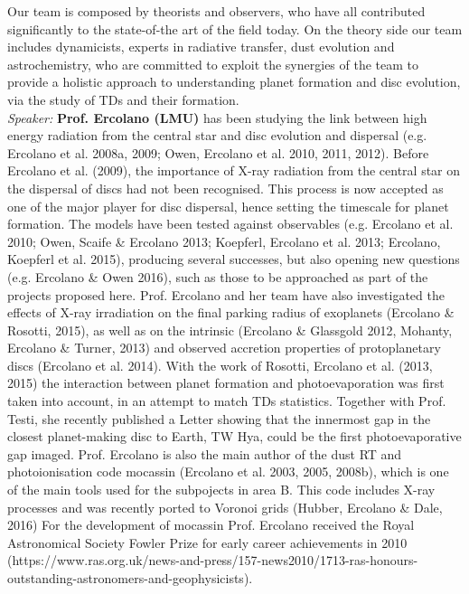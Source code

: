 \documentclass[12pt]{article}
\begin{document}
Our team is composed by theorists and observers, who have all
contributed significantly to the state-of-the art of the field today. 
On the theory side our team includes
dynamicists, experts in radiative transfer, dust evolution and astrochemistry, who are
committed to exploit the synergies of the team to provide a holistic
approach to understanding planet formation and disc evolution, via the
study of TDs and their formation. \\

{\it Speaker: }{\bf Prof. Ercolano (LMU)} has been studying the link between high
energy radiation from the central star and disc evolution and
dispersal (e.g. Ercolano et al. 2008a, 2009; Owen, Ercolano et
al. 2010, 2011, 2012). Before Ercolano et al. (2009), the importance
of X-ray radiation from the central star on the dispersal of discs had
not been recognised. This process is now accepted as one of the major
player for disc dispersal, hence setting the timescale for planet
formation. The models have been tested against observables
(e.g. Ercolano et al. 2010; Owen, Scaife \& Ercolano 2013; Koepferl,
Ercolano et al. 2013; Ercolano, Koepferl et al. 2015), producing
several successes, but also opening new questions (e.g. Ercolano \&
Owen 2016), such as those to be
approached as part of the projects proposed here. Prof. Ercolano and
her team have also investigated the effects of X-ray irradiation on
the final parking radius of exoplanets (Ercolano \& Rosotti, 2015), as
well as on the intrinsic (Ercolano \& Glassgold 2012, Mohanty,
Ercolano \& Turner, 2013) and observed
accretion properties of protoplanetary discs (Ercolano et
al. 2014). With the work of Rosotti, Ercolano et al. (2013, 2015) the
interaction between planet formation and photoevaporation was first
taken into account, in an attempt to match TDs
statistics. Together with Prof. Testi, she recently published a Letter
showing that the innermost gap in the closest planet-making disc to
Earth, TW Hya, could be the first photoevaporative gap
imaged. Prof. Ercolano is also the main author of the dust RT and 
photoionisation code {\sc mocassin} (Ercolano et al. 2003, 2005,
2008b), which is one of the main tools
used for the subpojects in area B. This code includes X-ray processes
and was recently ported to Voronoi grids (Hubber, Ercolano \& Dale,
2016) For the development of {\sc
  mocassin} Prof. Ercolano received the Royal Astronomical Society
Fowler Prize for early career achievements in 2010 (https://www.ras.org.uk/news-and-press/157-news2010/1713-ras-honours-outstanding-astronomers-and-geophysicists). \\
\end{document}
